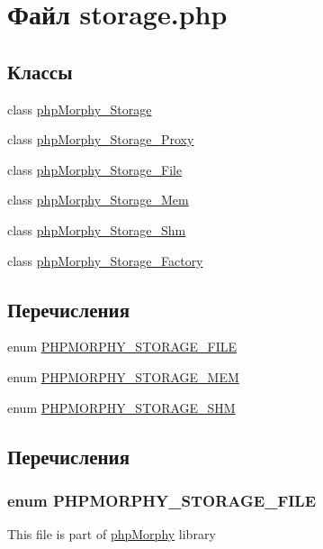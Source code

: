 \hypertarget{storage_8php}{
\section{Файл storage.php}
\label{storage_8php}
}
\subsection*{Классы}
\begin{DoxyCompactItemize}
\item 
class \hyperlink{classphpMorphy__Storage}{phpMorphy\_\-Storage}
\item 
class \hyperlink{classphpMorphy__Storage__Proxy}{phpMorphy\_\-Storage\_\-Proxy}
\item 
class \hyperlink{classphpMorphy__Storage__File}{phpMorphy\_\-Storage\_\-File}
\item 
class \hyperlink{classphpMorphy__Storage__Mem}{phpMorphy\_\-Storage\_\-Mem}
\item 
class \hyperlink{classphpMorphy__Storage__Shm}{phpMorphy\_\-Storage\_\-Shm}
\item 
class \hyperlink{classphpMorphy__Storage__Factory}{phpMorphy\_\-Storage\_\-Factory}
\end{DoxyCompactItemize}
\subsection*{Перечисления}
\begin{DoxyCompactItemize}
\item 
enum \hyperlink{storage_8php_a8abe0b7508e043fecb0d67081e3f446c}{PHPMORPHY\_\-STORAGE\_\-FILE} 
\item 
enum \hyperlink{storage_8php_a4126b264540f27e3184b6055aabc707b}{PHPMORPHY\_\-STORAGE\_\-MEM} 
\item 
enum \hyperlink{storage_8php_a4ba469b9fc911feb903abc91706fbb13}{PHPMORPHY\_\-STORAGE\_\-SHM} 
\end{DoxyCompactItemize}


\subsection{Перечисления}
\hypertarget{storage_8php_a8abe0b7508e043fecb0d67081e3f446c}{
\subsubsection[{PHPMORPHY\_\-STORAGE\_\-FILE}]{\setlength{\rightskip}{0pt plus 5cm}enum {\bf PHPMORPHY\_\-STORAGE\_\-FILE}}}
\label{storage_8php_a8abe0b7508e043fecb0d67081e3f446c}
This file is part of \hyperlink{classphpMorphy}{phpMorphy} library

